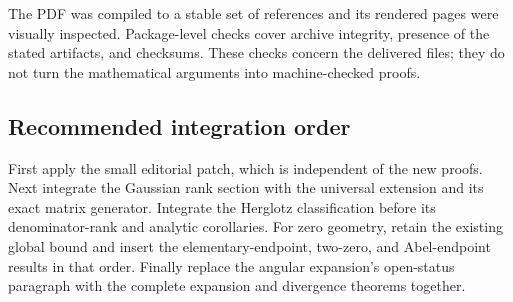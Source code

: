 \documentclass[11pt,a4paper]{article}
\theoremstyle{definition}
\theoremstyle{remark}
\numberwithin{equation}{section}
\begin{document}
The PDF was compiled to a stable set of references and its rendered
pages were visually inspected. Package-level checks cover archive
integrity, presence of the stated artifacts, and checksums. These
checks concern the delivered files; they do not turn the mathematical
arguments into machine-checked proofs.

\subsection{Recommended integration order}

First apply the small editorial patch, which is independent of the new
proofs. Next integrate the Gaussian rank section with the universal
extension and its exact matrix generator. Integrate the Herglotz
classification before its denominator-rank and analytic corollaries.
For zero geometry, retain the existing global bound and insert the
elementary-endpoint, two-zero, and Abel-endpoint results in that order.
Finally replace the angular expansion's open-status paragraph with
the complete expansion and divergence theorems together.
\end{document}
